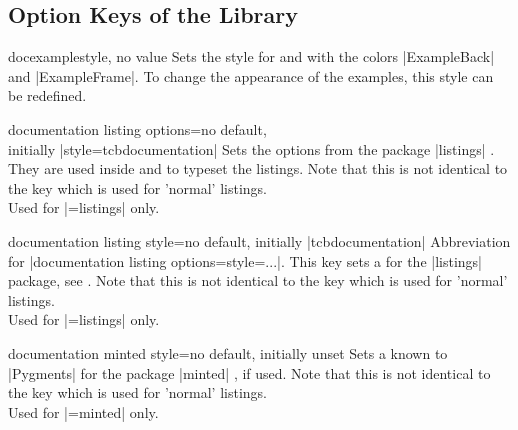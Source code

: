 \clearpage
\subsection{Option Keys of the Library}

\begin{docTcbKey}[][doc updated=2015-03-16]{docexample}{}{style, no value}
  Sets the style for  and 
  with the colors |ExampleBack| and |ExampleFrame|.
  To change the appearance of the examples, this style can be
  redefined.
\begin{dispListing}
\end{dispListing}
\end{docTcbKey}

\begin{docTcbKey}{documentation listing options}{=}{no default,\\\hspace*{\fill} initially |style=tcbdocumentation|}
  Sets the options from the package |listings| \cite{heinz:2015a}.
  They are used inside  and  to typeset
  the listings. Note that this is not identical to the key
   which is used for 'normal' listings.\\
  Used for |=listings| only.
\end{docTcbKey}

\begin{docTcbKey}{documentation listing style}{=}{no default, initially |tcbdocumentation|}
  Abbreviation for |documentation listing options={style=...}|.
  This key sets a 
  for the |listings| package, see \cite{heinz:2015a}.
  Note that this is not identical to the key
   which is used for 'normal' listings.\\
  Used for |=listings| only.
\end{docTcbKey}

\begin{docTcbKey}{documentation minted style}{=}{no default, initially unset}
  Sets a  known to |Pygments| \cite{pygments:2013} for
  the package |minted| \cite{poore:2015a}, if used.
  Note that this is not identical to the key
   which is used for 'normal' listings.\\
  Used for |=minted| only.
\end{docTcbKey}

